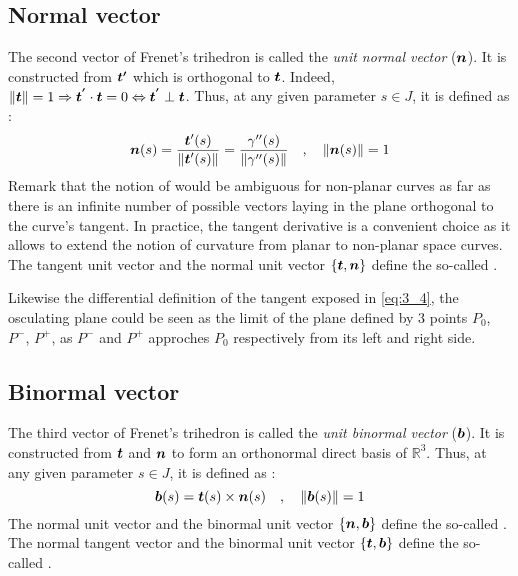 \subsection{Normal vector}
The second vector of Frenet's trihedron is called the \emph{unit normal vector} ($\boldsymbol{n}$). It is constructed from $\boldsymbol{t'}$ which is orthogonal to $\boldsymbol{t}$. Indeed, $\|\boldsymbol{t}\|=1 \Rightarrow \boldsymbol{t^{'}} \cdot  \boldsymbol{t} = 0 \Leftrightarrow  \boldsymbol{t^{'}} \perp \boldsymbol{t}$. Thus, at any given parameter $s \in J$, it is defined as :
\begin{equation}
\boldsymbol{n}(s) = \frac{\boldsymbol{t}'(s)}{\|\boldsymbol{t}'(s)\|} = \frac{\gamma''(s)}{\|\gamma''(s)\|}
\quad,\quad
\|\boldsymbol{n}(s)\|=1
\end{equation}
Remark that the notion of  would be ambiguous for non-planar curves as far as there is an infinite number of possible vectors laying in the plane orthogonal to the curve's tangent. In practice, the tangent derivative is a convenient choice as it allows to extend the notion of curvature from planar to non-planar space curves. The tangent unit vector and the normal unit vector $\{\boldsymbol{t},\boldsymbol{n}\}$ define the so-called .

Likewise the differential definition of the tangent exposed in \eqref{eq:3_4}, the osculating plane could be seen as the limit of the plane defined by 3 points $P_0$, $P^-$, $P^+$, as $P^-$ and $P^+$ approches $P_0$ respectively from its left and right side.


\subsection{Binormal vector}
The third vector of Frenet's trihedron is called the \emph{unit binormal vector} ($\boldsymbol{b}$). It is constructed from $\boldsymbol{t}$ and $\boldsymbol{n}$ to form an orthonormal direct basis of $\mathbb{R}^{3}$. Thus, at any given parameter $s \in J$, it is defined as :
\begin{equation}
\boldsymbol{b}(s) = \boldsymbol{t}(s) \times \boldsymbol{n}(s)
\quad,\quad
\|\boldsymbol{b}(s)\|=1
\end{equation}
The normal unit vector and the binormal unit vector $\{\boldsymbol{n},\boldsymbol{b}\}$ define the so-called .
The normal tangent vector and the binormal unit vector $\{\boldsymbol{t},\boldsymbol{b}\}$ define the so-called .


